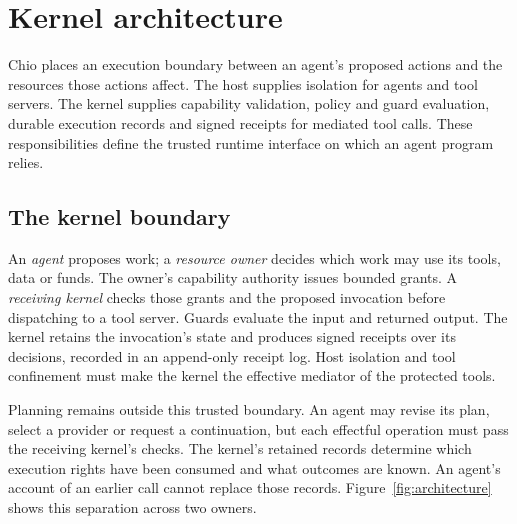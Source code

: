 \section{Kernel architecture}
\label{sec:sovereignty}
Chio places an execution boundary between an agent's proposed actions and the
resources those actions affect. The host supplies isolation for agents and
tool servers. The kernel supplies capability validation, policy and guard
evaluation, durable execution records and signed receipts for mediated tool
calls. These responsibilities define the trusted runtime interface on which an
agent program relies.

\subsection{The kernel boundary}
An \emph{agent} proposes work; a \emph{resource owner} decides which work may use
its tools, data or funds. The owner's capability authority issues bounded grants.
A \emph{receiving kernel} checks those grants and the proposed invocation before
dispatching to a tool server. Guards evaluate the input and returned output.
The kernel retains the invocation's state and produces signed receipts over its
decisions, recorded in an append-only receipt log. Host isolation and tool
confinement must make the kernel the effective mediator of the protected tools.

Planning remains outside this trusted boundary. An agent may revise its plan,
select a provider or request a continuation, but each effectful operation must
pass the receiving kernel's checks. The kernel's retained records determine
which execution rights have been consumed and what outcomes are known.
An agent's account of an earlier call cannot replace those records.
Figure~\ref{fig:architecture} shows this separation across two owners.

